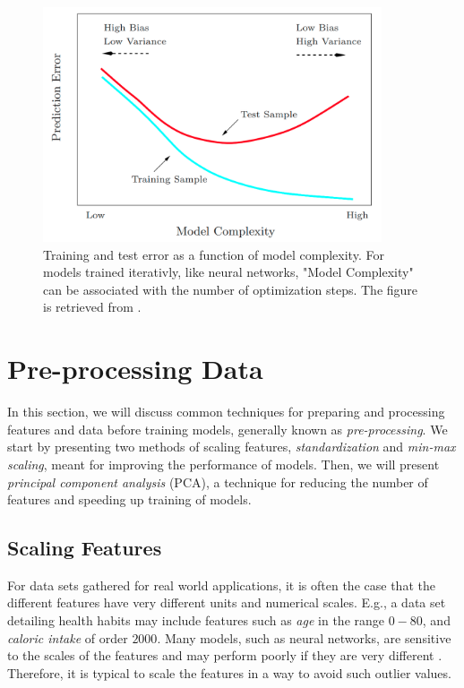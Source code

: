 \begin{figure}[H]
    \centering
    \includegraphics[width=10cm]{latex/figures/train_test.png}
    \caption{Training and test error as a function of model complexity. For models trained iterativly, like neural networks, "Model Complexity" can be associated with the number of optimization steps. The figure is retrieved from \citet{hastie01statisticallearning}.}
    \label{fig:train_test}
\end{figure}


\section{Pre-processing Data}\label{sec:Pre-processing Features Theory}
In this section, we will discuss common techniques for preparing and processing features and data before training models, generally known as \emph{pre-processing}. We start by presenting two methods of scaling features, \emph{standardization} and \emph{min-max scaling}, meant for improving the performance of models. Then, we will present \emph{principal component analysis} (PCA), a technique for reducing the number of features and speeding up training of models. 

\subsection{Scaling Features}\label{sec:Scaling Features}
For data sets gathered for real world applications, it is often the case that the different features have very different units and numerical scales. E.g., a data set detailing health habits may include features such as \emph{age} in the range $0-80$, and \emph{caloric intake} of order $2000$. Many models, such as neural networks, are sensitive to the scales of the features and may perform poorly if they are very different \cite{hands-on}. Therefore, it is typical to scale the features in a way to avoid such outlier values. 

